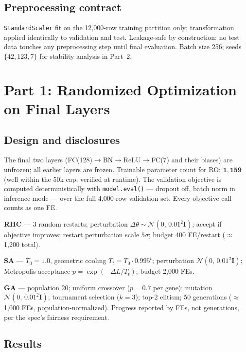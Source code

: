 \documentclass[conference]{IEEEtran}
\begin{document}
\subsection{Preprocessing contract}\label{sec:data:preprocess}
\texttt{StandardScaler} fit on the 12{,}000-row training partition only;
transformation applied identically to validation and test.
Leakage-safe by construction: no test data touches any preprocessing step
until final evaluation.
Batch size 256; seeds $\{42, 123, 7\}$ for stability analysis in Part~2.

\section{Part 1: Randomized Optimization on Final Layers}\label{sec:p1}

\subsection{Design and disclosures}\label{sec:p1:design}
The final two layers (FC(128)$\to$BN$\to$ReLU$\to$FC(7) and their biases)
are unfrozen; all earlier layers are frozen.
Trainable parameter count for RO: $\mathbf{1{,}159}$
(well within the 50k cap; verified at runtime).
The validation objective is computed deterministically with
\texttt{model.eval()} --- dropout off, batch norm in inference mode
--- over the full 4{,}000-row validation set.
Every objective call counts as one FE.

\textbf{RHC} --- 3 random restarts; perturbation $\Delta\theta
\sim\mathcal{N}(0,\,0.01^2\mathbf{I})$; accept if objective improves; restart
perturbation scale $5\sigma$; budget 400 FE/restart ($\approx$1{,}200 total).

\textbf{SA} --- $T_0{=}1.0$, geometric cooling $T_t{=}T_0 \cdot 0.995^t$;
perturbation $\mathcal{N}(0,\,0.01^2\mathbf{I})$;
Metropolis acceptance $p{=}\exp(-\Delta L/T_t)$; budget 2{,}000 FEs.

\textbf{GA} --- population 20; uniform crossover ($p{=}0.7$ per gene);
mutation $\mathcal{N}(0,\,0.01^2\mathbf{I})$; tournament selection ($k{=}3$);
top-2 elitism; 50 generations ($\approx$1{,}000 FEs, population-normalized).
Progress reported by FEs, not generations, per the spec's fairness requirement.

\subsection{Results}\label{sec:p1:results}
\end{document}
